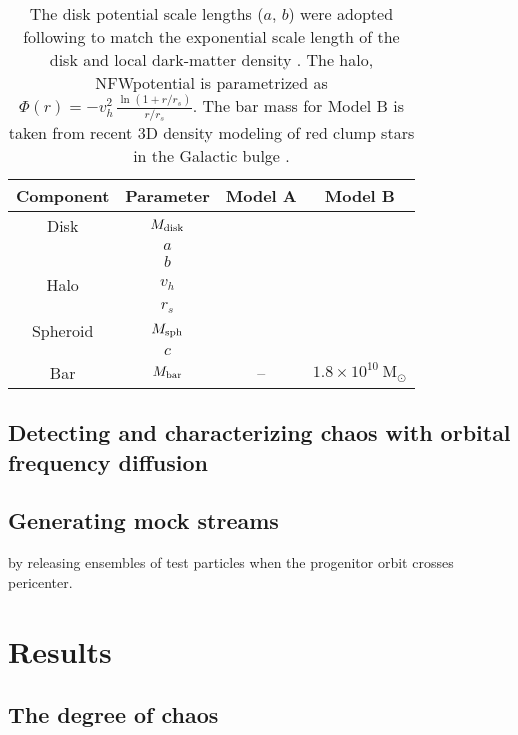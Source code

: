 \documentclass[letterpaper,12pt,preprint]{aastex}
\newcommand{\msun}{\ensuremath{\mathrm{M}_\odot}}
\begin{document}
\begin{table*}[ht]
\begin{center}
	\begin{tabular}{ c | c | c | c}
	         \toprule
	         Component & Parameter & {\bf Model A} & {\bf Model B}\\\toprule
		Disk & $M_{\rm disk}$ &  & \\
		& $a$ &  & \\
		& $b$ &  &  \\\midrule
	         Halo & $v_h$ &  & \\
		& $r_s$ &  & \\\midrule
		Spheroid & $M_{\rm sph}$ &  & \\
		& $c$ &  & \\\midrule
		Bar & $M_{\rm bar}$ & -- & $1.8 \times 10^{10}~\msun$ \\
		\bottomrule
		\end{tabular}
	\caption{The disk potential scale lengths ($a$, $b$) were adopted following \citep{bovy15-galpy} to match the exponential scale length of the disk \citep{bovyrix13} and local dark-matter density \citep[e.g.,][]{bovytremaine12}. The halo, NFWpotential is parametrized as $\Phi(r) = -v_h^2\,\frac{\ln{(1 + r/r_s)}}{r/r_s}$. The bar mass for Model B is taken from recent 3D density modeling of red clump stars in the Galactic bulge \citep{portail15}. \label{tbl:potential}}
\end{center}
\end{table*}

\subsection{Detecting and characterizing chaos with orbital frequency diffusion}\label{sec:chaos-indicator}

\subsection{Generating mock streams}\label{sec:mocks}

by releasing ensembles of test particles when the progenitor orbit crosses pericenter.

\section{Results}

\subsection{The degree of chaos}\label{sec:results1}
\end{document}
